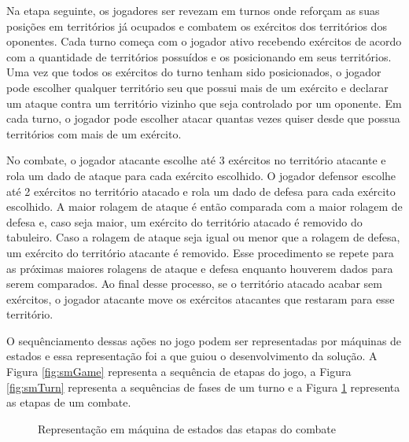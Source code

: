 \documentclass[rel_mlp]{iiufrgs}
\numberwithin{figure}{chapter}
\begin{document}
Na etapa seguinte, os jogadores ser revezam em turnos onde reforçam as suas posições em territórios já ocupados e combatem os exércitos dos territórios dos oponentes. Cada turno começa com o jogador ativo recebendo exércitos de acordo com a quantidade de territórios possuídos e os posicionando em seus territórios. Uma vez que todos os exércitos do turno tenham sido posicionados, o jogador pode escolher qualquer território seu que possui mais de um exército e declarar um ataque contra um território vizinho que seja controlado por um oponente. Em cada turno, o jogador pode escolher atacar quantas vezes quiser desde que possua territórios com mais de um exército.

No combate, o jogador atacante escolhe até 3 exércitos no território atacante e rola um dado de ataque para cada exército escolhido. O jogador defensor escolhe até 2 exércitos no território atacado e rola um dado de defesa para cada exército escolhido. A maior rolagem de ataque é então comparada com a maior rolagem de defesa e, caso seja maior, um exército do território atacado é removido do tabuleiro. Caso a rolagem de ataque seja igual ou menor que a rolagem de defesa, um exército do território atacante é removido. Esse procedimento se repete para as próximas maiores rolagens de ataque e defesa enquanto houverem dados para serem comparados. Ao final desse processo, se o território atacado acabar sem exércitos, o jogador atacante move os exércitos atacantes que restaram para esse território.

O sequênciamento dessas ações no jogo podem ser representadas por máquinas de estados e essa representação foi a que guiou o desenvolvimento da solução. A Figura \ref{fig:smGame} representa a sequência de etapas do jogo, a Figura \ref{fig:smTurn} representa a sequências de fases de um turno e a Figura \ref{fig:smAttack} representa as etapas de um combate.

\begin{figure}
\caption{Representação em máquina de estados das etapas do combate}
\label{fig:smAttack}
\end{figure}
\end{document}
